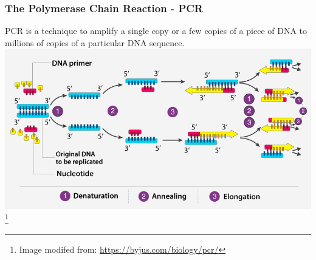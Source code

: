 \documentclass{beamer}
\newcommand\blfootnote[1]{%
	\begingroup
	\renewcommand\thefootnote{}\footnote{#1}%
	\addtocounter{footnote}{-1}%
	\endgroup
}
\begin{document}
\begin{frame}
	\frametitle{The Polymerase Chain Reaction - PCR}
\centering	PCR is a technique to amplify a single copy or a few copies of a piece of DNA to millions of copies of a particular DNA sequence. 
			\centering \includegraphics[keepaspectratio, width  =\textwidth]{img/PCR} 
			\blfootnote{Image modifed from: \url{https://byjus.com/biology/pcr/}}
\end{frame}
\end{document}

